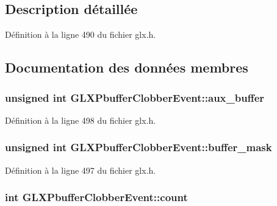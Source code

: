 \subsection{Description détaillée}


Définition à la ligne 490 du fichier glx.\-h.



\subsection{Documentation des données membres}
\hypertarget{struct_g_l_x_pbuffer_clobber_event_a13193b6e7e3e52b15f754fe91403b7ec}{
\subsubsection[{aux\-\_\-buffer}]{\setlength{\rightskip}{0pt plus 5cm}unsigned int G\-L\-X\-Pbuffer\-Clobber\-Event\-::aux\-\_\-buffer}}\label{struct_g_l_x_pbuffer_clobber_event_a13193b6e7e3e52b15f754fe91403b7ec}


Définition à la ligne 498 du fichier glx.\-h.

\hypertarget{struct_g_l_x_pbuffer_clobber_event_aff4c23d00f6dad98427f8d32a5f10580}{
\subsubsection[{buffer\-\_\-mask}]{\setlength{\rightskip}{0pt plus 5cm}unsigned int G\-L\-X\-Pbuffer\-Clobber\-Event\-::buffer\-\_\-mask}}\label{struct_g_l_x_pbuffer_clobber_event_aff4c23d00f6dad98427f8d32a5f10580}


Définition à la ligne 497 du fichier glx.\-h.

\hypertarget{struct_g_l_x_pbuffer_clobber_event_a61e9f6b31738464dca67f909fcacd298}{
\subsubsection[{count}]{\setlength{\rightskip}{0pt plus 5cm}int G\-L\-X\-Pbuffer\-Clobber\-Event\-::count}}\label{struct_g_l_x_pbuffer_clobber_event_a61e9f6b31738464dca67f909fcacd298}


